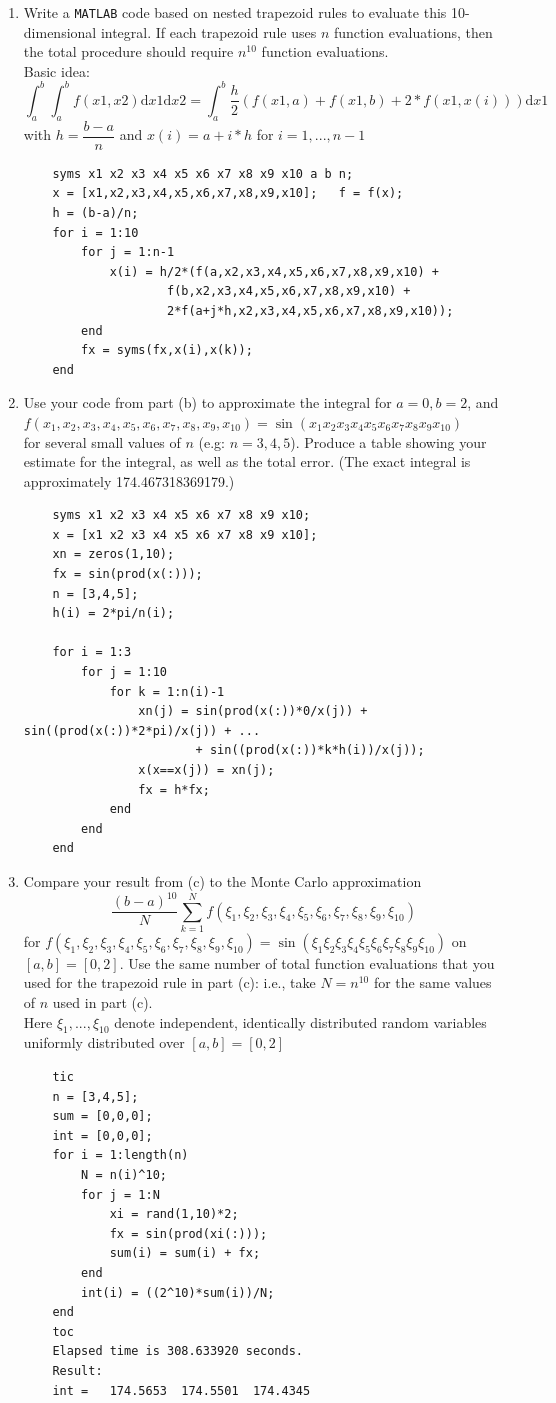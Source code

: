 \documentclass[14pt,a4paper]{article}
\begin{document}
\begin{enumerate}
	
	\label{4b}	
	\item Write a \texttt{MATLAB} code based on nested trapezoid rules to evaluate this 10-dimensional integral. If each trapezoid rule uses $n$ function evaluations, then the total procedure should require $n^{10}$ function evaluations. \\
	Basic idea:
	$$ \int_{a}^{b}\int_{a}^{b}f(x1,x2)\mathrm{d}x1\mathrm{d}x2 = \int_{a}^{b}\dfrac{h}{2}\left( f(x1,a) + f(x1,b) + 2*f(x1,x(i))\right)\mathrm{d}x1 $$
	with $h = \dfrac{b-a}{n}$ and $x(i) = a + i*h$ for $i = 1, ..., n-1$
	\begin{lstlisting}
	syms x1 x2 x3 x4 x5 x6 x7 x8 x9 x10 a b n;
	x = [x1,x2,x3,x4,x5,x6,x7,x8,x9,x10]; 	f = f(x);
	h = (b-a)/n;
	for i = 1:10
		for j = 1:n-1
			x(i) = h/2*(f(a,x2,x3,x4,x5,x6,x7,x8,x9,x10) + 
					f(b,x2,x3,x4,x5,x6,x7,x8,x9,x10) +
					2*f(a+j*h,x2,x3,x4,x5,x6,x7,x8,x9,x10));
		end
		fx = syms(fx,x(i),x(k));
	end
	\end{lstlisting}	
		
	\label{4c}
	\item Use your code from part (b) to approximate the integral for $a = 0, b = 2$, and\\
	$ f(x_1,x_2,x_3,x_4,x_5,x_6,x_7,x_8,x_9,x_{10}) = \sin(x_1x_2x_3x_4x_5x_6x_7x_8x_9x_{10}) $\\
	for several small values of $n$ (e.g: $n = 3,4,5$). Produce a table showing your estimate for the integral, as well as the total error. (The exact integral is approximately 174.467318369179.)
	\begin{lstlisting}
	syms x1 x2 x3 x4 x5 x6 x7 x8 x9 x10;
	x = [x1 x2 x3 x4 x5 x6 x7 x8 x9 x10];
	xn = zeros(1,10);
	fx = sin(prod(x(:)));
	n = [3,4,5];
	h(i) = 2*pi/n(i);
	
	for i = 1:3
		for j = 1:10
			for k = 1:n(i)-1
				xn(j) = sin(prod(x(:))*0/x(j)) + sin((prod(x(:))*2*pi)/x(j)) + ...
						+ sin((prod(x(:))*k*h(i))/x(j));
				x(x==x(j)) = xn(j);
				fx = h*fx;
			end
		end
	end
	\end{lstlisting}
	\label{4d}
	\item Compare your result from (c) to the Monte Carlo approximation
	$$ \dfrac{(b-a)^{10}}{N} \sum_{k=1}^{N} f(\xi_1, \xi_2, \xi_3, \xi_4, \xi_5, \xi_6, \xi_7, \xi_8, \xi_9, \xi_{10}) $$
	for $ f(\xi_1, \xi_2, \xi_3, \xi_4, \xi_5, \xi_6, \xi_7, \xi_8, \xi_9, \xi_{10}) = \sin(\xi_1 \xi_2 \xi_3 \xi_4 \xi_5 \xi_6 \xi_7 \xi_8 \xi_9 \xi_{10})$ on $[a,b] = [0,2]$. Use the same number of total function evaluations that you used for the trapezoid rule in part (c): i.e., take $N = n^{10}$ for the same values of $n$ used in part (c). \\
	Here $\xi_1, ..., \xi_{10}$ denote independent, identically distributed random variables uniformly distributed over $[a,b] = [0,2]$
	\begin{lstlisting}
	tic
	n = [3,4,5];
	sum = [0,0,0];
	int = [0,0,0];
	for i = 1:length(n)
		N = n(i)^10;
		for j = 1:N
			xi = rand(1,10)*2;
			fx = sin(prod(xi(:)));
			sum(i) = sum(i) + fx;
		end
		int(i) = ((2^10)*sum(i))/N;
	end
	toc
	Elapsed time is 308.633920 seconds.
	Result:
	int =	174.5653  174.5501  174.4345
	

\end{lstlisting}
\end{enumerate}
\end{document}
